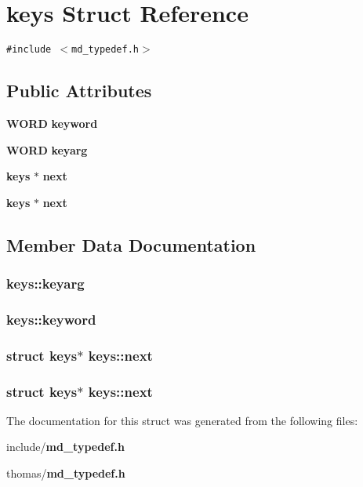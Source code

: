 \section{keys Struct Reference}
\label{structkeys}
{\tt \#include $<$md\_\-typedef.h$>$}

\subsection*{Public Attributes}
\begin{CompactItemize}
\item 
{\bf WORD} {\bf keyword}
\item 
{\bf WORD} {\bf keyarg}
\item 
{\bf keys} $\ast$ {\bf next}
\item 
{\bf keys} $\ast$ {\bf next}
\end{CompactItemize}


\subsection{Member Data Documentation}
\subsubsection{ {\bf keys::keyarg}}\label{structkeys_663b02e9e2d5aa3af2137fbc8ad8eac1}


\subsubsection{ {\bf keys::keyword}}\label{structkeys_4a5b058f5dd7f9a086a2f2a3d06f5490}


\subsubsection{\setlength{\rightskip}{0pt plus 5cm}struct {\bf keys}$\ast$ {\bf keys::next}}\label{structkeys_45dd7e89a90a60117b676282a9e19eb5}


\subsubsection{\setlength{\rightskip}{0pt plus 5cm}struct {\bf keys}$\ast$ {\bf keys::next}}\label{structkeys_45dd7e89a90a60117b676282a9e19eb5}




The documentation for this struct was generated from the following files:\begin{CompactItemize}
\item 
include/{\bf md\_\-typedef.h}\item 
thomas/{\bf md\_\-typedef.h}\end{CompactItemize}
